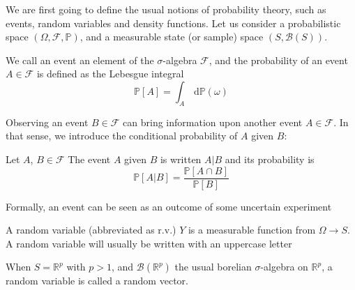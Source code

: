 \documentclass[a4paper,11pt]{article}
\newcommand{\Prob}{\mathbb{P}}
\theoremstyle{defi}
\numberwithin{thmCounter}{section}
\begin{document}
We are first going to define the usual notions of probability theory, such as events, random variables and density functions.
Let us consider a probabilistic space $(\Omega, \mathcal{F}, \Prob)$, and a measurable state (or sample) space $(S, \mathcal{B}(S))$.
\begin{definition}
  \label{def:prob_event}
   We call an event an element of the $\sigma$-algebra $\mathcal{F}$, and the probability of an event $A\in \mathcal{F}$ is defined as the Lebesgue integral
  \begin{equation}
    \Prob[A] = \int_{A} \,\mathrm{d}\Prob(\omega)
  \end{equation}
\end{definition}
Observing an event $B \in \mathcal{F}$ can bring information upon another event $A\in \mathcal{F}$. In that sense, we introduce the conditional probability of $A$ given $B$:
\begin{definition}
  \label{def:cond_proba}
  Let $A$, $B \in \mathcal{F}$
  The event $A$ given $B$ is written $A | B$ and its probability is
  \begin{equation}
    \Prob[A | B] = \frac{\Prob[A \cap B]}{\Prob[B]}
  \end{equation}
\end{definition}
Formally, an event can be seen as an outcome of some uncertain experiment
\begin{definition}
  \label{def:random_variable}
  A random variable (abbreviated as r.v.) $Y$ is a measurable function from $\Omega \longrightarrow S$. A random variable will usually be written with an uppercase letter
\end{definition}
\begin{remark}
  When $S = \mathbb{R}^p$ with $p > 1$, and $\mathcal{B}(\mathbb{R}^p)$ the usual borelian $\sigma$-algebra on $\mathbb{R}^p$, a random variable is called a random vector.
\end{remark}
\end{document}
